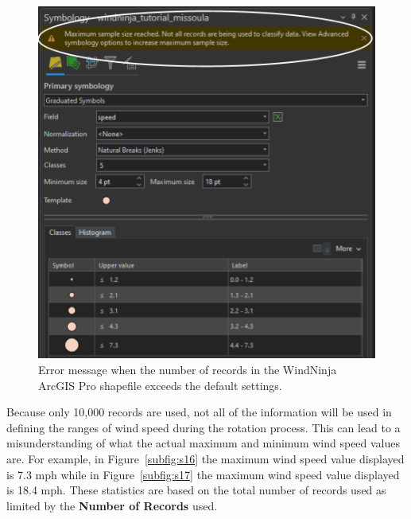 \documentclass[12pt]{article}
\begin{document}
\begin{figure}[H]
	\centering
	\includegraphics[scale=0.55]{arc_7.png}
	\caption{Error message when the number of records in the WindNinja ArcGIS Pro shapefile exceeds the default settings.}
\label{fig:Figure16}
\end{figure}

Because only 10,000 records are used, not all of the information will be used in defining the ranges of wind speed during the rotation process. This can lead to a misunderstanding of what the actual maximum and minimum wind speed values are. For example, in Figure~\ref{subfig:s16} the maximum wind speed value displayed is 7.3 mph while in Figure~\ref{subfig:s17} the maximum wind speed value displayed is 18.4 mph. These statistics are based on the total number of records used as limited by the \textbf{Number of Records} used.
\end{document}
